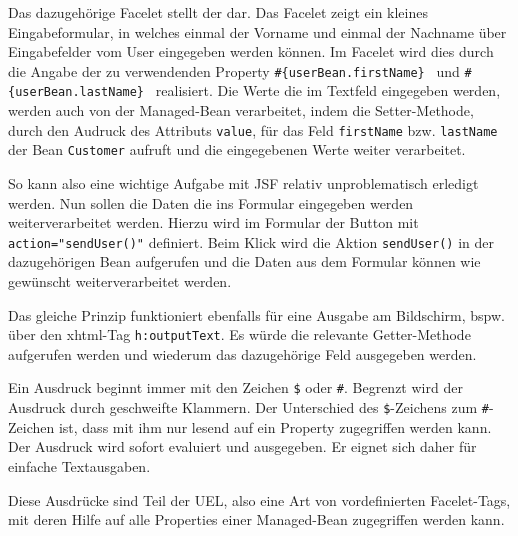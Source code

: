 Das dazugehörige Facelet stellt der  dar. Das Facelet zeigt ein kleines Eingabeformular, in welches einmal der Vorname und einmal der Nachname über Eingabefelder vom User eingegeben werden können. Im Facelet wird dies durch die Angabe der zu verwendenden Property \texttt{\#\{userBean.firstName\} } und \texttt{\#\{userBean.lastName\} } realisiert. Die Werte die im Textfeld eingegeben werden, werden auch von der Managed-Bean verarbeitet, indem die Setter-Methode, durch den Audruck des Attributs \texttt{value}, für das Feld \texttt{firstName} bzw. \texttt{lastName} der Bean \texttt{Customer} aufruft und die eingegebenen Werte weiter verarbeitet.

So kann also eine wichtige Aufgabe mit JSF relativ unproblematisch erledigt werden.
Nun sollen die Daten die ins Formular eingegeben werden weiterverarbeitet werden.
Hierzu wird im Formular der Button mit \texttt{action="sendUser()"} definiert. Beim Klick wird die Aktion \texttt{sendUser()} in der dazugehörigen Bean aufgerufen und die Daten aus dem Formular können wie gewünscht weiterverarbeitet werden.

Das gleiche Prinzip funktioniert ebenfalls für eine Ausgabe am Bildschirm, bspw. über den xhtml-Tag \texttt{h:outputText}. Es würde die relevante Getter-Methode aufgerufen werden und wiederum das dazugehörige Feld ausgegeben werden. 

	

Ein Ausdruck beginnt immer mit den Zeichen \texttt{\$} oder \texttt{\#}. Begrenzt wird der Ausdruck durch geschweifte Klammern. Der Unterschied des \texttt{\$}-Zeichens zum \texttt{\#}-Zeichen ist, dass mit ihm nur lesend auf ein Property zugegriffen werden kann.
Der Ausdruck wird sofort evaluiert und ausgegeben. Er eignet sich daher für einfache Textausgaben.

Diese Ausdrücke sind Teil der \ac{UEL}, also eine Art von vordefinierten Facelet-Tags, mit deren Hilfe auf alle Properties einer Managed-Bean zugegriffen werden kann. 
	
	

